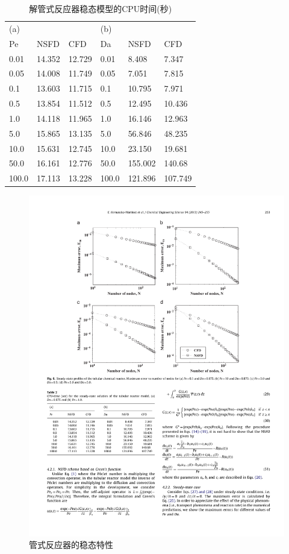 \documentclass[a4paper,cs4size,adobefonts,cm-default,no-math]{ctexart}
\begin{document}
\begin{table}
\caption{解管式反应器稳态模型的CPU时间(秒)\label{tab:2}}
\begin{tabularx}{\textwidth}{@{\extracolsep{5mm}}*{6}{X}}
\toprule
\multicolumn{3}{l}{(a)}&\multicolumn{3}{l}{(b)}\\
\cmidrule{1-3}\cmidrule{4-6}
Pe 	&	NSFD	&	CFD	&	Da	&	NSFD	&	CFD \\	
\midrule
0.01	&   14.352	&	12.729	&	0.01	&	8.408	&	7.347	\\
0.05	&   14.008	&	11.749	&	0.05	&	7.051	&	7.815	\\
0.1	&   13.603	&	11.715	&	0.1	&	10.795	&	7.971	\\
0.5	&   13.854	&	11.512	&	0.5	&	12.495	&	10.436	\\
1.0	&   14.118	&	11.965	&	1.0	&	16.146	&	12.963	\\
5.0	&   15.865	&	13.135	&	5.0	&	56.846	&	48.235	\\
10.0	&   15.631	&	12.745	&	10.0	&	23.150	&	19.681	\\
50.0	&   16.161	&	12.776	&	50.0	&	155.002	&	140.68	\\
100.0	&   17.113	&	13.228	&	100.0	&	121.896	&	107.749	\\
\bottomrule
\end{tabularx}
\end{table}
\begin{figure}
\centering
\includegraphics[trim=80 390 80 60,clip]{./pic/f6.pdf}
\caption{管式反应器的稳态特性}\label{fig:6}
\end{figure}
\end{document}
